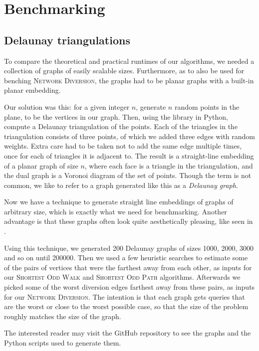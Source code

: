 \section{Benchmarking}


\subsection{Delaunay triangulations}
\label{subsection:delaunay}
To compare the theoretical and practical runtimes of our algorithms, we needed a collection of graphs of easily scalable sizes. Furthermore, as to also be used for benching \textsc{Network Diversion}, the graphs had to be planar graphs with a built-in planar embedding.

Our solution was this: for a given integer $n$, generate $n$ random points in the plane, to be the vertices in our graph. Then, using the  library in Python, compute a Delaunay triangulation of the points. Each of the triangles in the triangulation consists of three points, of which we added three edges with random weights. Extra care had to be taken not to add the same edge multiple times, once for each of triangles it is adjacent to. The result is a straight-line embedding of a planar graph of size $n$, where each face is a triangle in the triangulation, and the dual graph is a Voronoi diagram of the set of points. Though the term is not common, we like to refer to a graph generated like this as a \emph{Delaunay graph}.

Now we have a technique to generate straight line embeddings of graphs of arbitrary size, which is exactly what we need for benchmarking. Another advantage is that these graphs often look quite aesthetically pleasing, like seen in .

Using this technique, we generated 200 Delaunay graphs of sizes 1000, 2000, 3000 and so on until 200000. Then we used a few heuristic searches to estimate some of the pairs of vertices that were the farthest away from each other, as inputs for our \textsc{Shortest Odd Walk} and \textsc{Shortest Odd Path} algorithms. Afterwards we picked some of the worst diversion edges farthest away from these pairs, as inputs for our \textsc{Network Diversion}. The intention is that each graph gets queries that are the worst or close to the worst possible case, so that the size of the problem roughly matches the size of the graph.

The interested reader may visit the GitHub repository \cite{source:codebase} to see the graphs and the Python scripts used to generate them.
